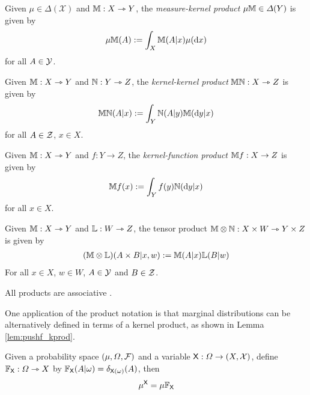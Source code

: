 \begin{definition}
Given $\mu\in \Delta(\mathcal{X})$ and $\mathbb{M}:X\rightarrowtriangle Y$, the \emph{measure-kernel product} $\mu\mathbb{M}\in \Delta(Y)$ is given by
\begin{align}
\mu\mathbb{M} (A) := \int_X \mathbb{M}(A|x) \mu(\mathrm{d}x)
\end{align}
for all $A\in \mathcal{Y}$.
\end{definition}

\begin{definition}\label{def:kproduct}
Given $\mathbb{M}:X\rightarrowtriangle Y$ and $\mathbb{N}:Y\rightarrowtriangle Z$, the \emph{kernel-kernel product} $\mathbb{M}\mathbb{N}:X\rightarrowtriangle Z$ is given by
\begin{align}
\mathbb{MN} (A|x) := \int_Y \mathbb{N}(A|y) \mathbb{M}(\mathrm{d}y|x)
\end{align}
for all $A\in \mathcal{Z}$, $x\in X$.
\end{definition}

\begin{definition}
Given $\mathbb{M}:X\rightarrowtriangle Y$ and $f:Y\to Z$, the \emph{kernel-function product} $\mathbb{M}f:X\to Z$ is given by
\begin{align}
\mathbb{M}f (x) := \int_Y f(y)\mathbb{N}(\mathrm{d}y|x)
\end{align}
for all $x\in X$.
\end{definition}

\begin{definition}
Given $\mathbb{M}:X\rightarrowtriangle Y$ and $\mathbb{L}:W\rightarrowtriangle Z$, the tensor product $\mathbb{M}\otimes\mathbb{N}:X\times W\rightarrowtriangle Y\times Z$ is given by
\begin{align}
	(\mathbb{M}\otimes\mathbb{L})(A\times B|x,w):=\mathbb{M}(A|x)\mathbb{L}(B|w)
\end{align}
For all $x\in X$, $w\in W$, $A\in \mathcal{Y}$ and $B\in \mathcal{Z}$.
\end{definition}

All products are associative \citep[Chapter 1]{cinlar_probability_2011}.

One application of the product notation is that marginal distributions can be alternatively defined in terms of a kernel product, as shown in Lemma \ref{lem:pushf_kprod}.

\begin{lemma}\label{lem:pushf_kprod}
Given a probability space $(\mu,\Omega,\mathcal{F})$ and a variable $\mathsf{X}:\Omega\to (X,\mathcal{X})$, define $\mathbb{F}_{\mathsf{X}}:\Omega\rightarrowtriangle X$ by $\mathbb{F}_{\mathsf{X}}(A|\omega)=\delta_{\mathsf{X}(\omega)}(A)$, then
\begin{align}
	\mu^{\mathsf{X}} = \mu\mathbb{F}_{\mathsf{X}}
\end{align}
\end{lemma}

